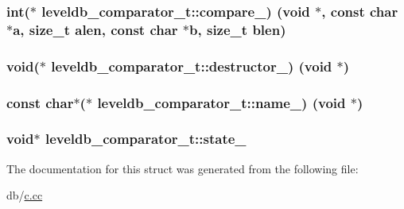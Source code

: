 \subsubsection[{compare\+\_\+}]{\setlength{\rightskip}{0pt plus 5cm}int($\ast$ leveldb\+\_\+comparator\+\_\+t\+::compare\+\_\+) (void $\ast$, const char $\ast$a, size\+\_\+t alen, const char $\ast$b, size\+\_\+t blen)}\label{structleveldb__comparator__t_a55906beb72b9f3502c941c16c1187719}
\hypertarget{structleveldb__comparator__t_a757b51457e991ab2219fd5931426bb29}{}
\subsubsection[{destructor\+\_\+}]{\setlength{\rightskip}{0pt plus 5cm}void($\ast$ leveldb\+\_\+comparator\+\_\+t\+::destructor\+\_\+) (void $\ast$)}\label{structleveldb__comparator__t_a757b51457e991ab2219fd5931426bb29}
\hypertarget{structleveldb__comparator__t_a0ed64d60a3e077ed065d745fb6bdee15}{}
\subsubsection[{name\+\_\+}]{\setlength{\rightskip}{0pt plus 5cm}const char$\ast$($\ast$ leveldb\+\_\+comparator\+\_\+t\+::name\+\_\+) (void $\ast$)}\label{structleveldb__comparator__t_a0ed64d60a3e077ed065d745fb6bdee15}
\hypertarget{structleveldb__comparator__t_a720da927befa8098f21437c663d0b0e2}{}
\subsubsection[{state\+\_\+}]{\setlength{\rightskip}{0pt plus 5cm}void$\ast$ leveldb\+\_\+comparator\+\_\+t\+::state\+\_\+}\label{structleveldb__comparator__t_a720da927befa8098f21437c663d0b0e2}


The documentation for this struct was generated from the following file\+:\begin{DoxyCompactItemize}
\item 
db/\hyperlink{c_8cc}{c.\+cc}\end{DoxyCompactItemize}

